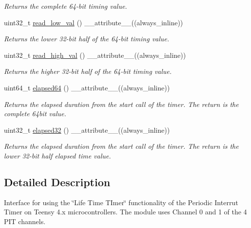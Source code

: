 \begin{DoxyCompactItemize}
\begin{DoxyCompactList}\small\item\em Returns the complete 64-\/bit timing value. \end{DoxyCompactList}\item 
uint32\+\_\+t \hyperlink{classPIT__LifetimeTimer_a4f7f8cd3847b9edb19dfa27f048a08cc}{read\+\_\+low\+\_\+val} () \+\_\+\+\_\+attribute\+\_\+\+\_\+((always\+\_\+inline))
\begin{DoxyCompactList}\small\item\em Returns the lower 32-\/bit half of the 64-\/bit timing value. \end{DoxyCompactList}\item 
uint32\+\_\+t \hyperlink{classPIT__LifetimeTimer_a39b0861ac88aec5e53f326409d536bcf}{read\+\_\+high\+\_\+val} () \+\_\+\+\_\+attribute\+\_\+\+\_\+((always\+\_\+inline))
\begin{DoxyCompactList}\small\item\em Returns the higher 32-\/bit half of the 64-\/bit timing value. \end{DoxyCompactList}\item 
uint64\+\_\+t \hyperlink{classPIT__LifetimeTimer_a04adf2272a47d4c81a28c6363e2da4fd}{elapsed64} () \+\_\+\+\_\+attribute\+\_\+\+\_\+((always\+\_\+inline))
\begin{DoxyCompactList}\small\item\em Returns the elapsed duration from the start call of the timer. The return is the complete 64bit value. \end{DoxyCompactList}\item 
uint32\+\_\+t \hyperlink{classPIT__LifetimeTimer_af7481214070333f845a23456b4d75880}{elapsed32} () \+\_\+\+\_\+attribute\+\_\+\+\_\+((always\+\_\+inline))
\begin{DoxyCompactList}\small\item\em Returns the elapsed duration from the start call of the timer. The return is the lower 32-\/bit half elapsed time value. \end{DoxyCompactList}\end{DoxyCompactItemize}


\subsection{Detailed Description}
Interface for using the \char`\"{}\+Life Time T\+Imer\char`\"{} functionality of the Periodic Interrut Timer on Teensy 4.\+x microcontrollers. The module uses Channel 0 and 1 of the 4 P\+IT channels. 

